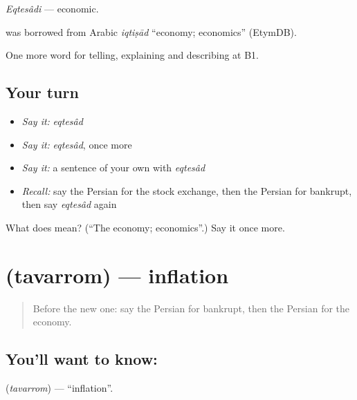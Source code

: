 \emph{Eqtesâdi} — economic.

\begin{cousinweb}
\textbf{} was borrowed from Arabic \emph{iqtiṣād} \textquotedblleft{}economy; economics\textquotedblright{} (EtymDB).
\end{cousinweb}

\begin{grammarlens}[title={What you've built}]
One more word for telling, explaining and describing at B1.
\end{grammarlens}

\subsection*{Your turn}
\begin{itemize}
\raggedright
  \item \emph{Say it:} \emph{eqtesâd}
  \item \emph{Say it:} \emph{eqtesâd}, once more
  \item \emph{Say it:} a sentence of your own with \emph{eqtesâd}
  \item \emph{Recall:} say the Persian for the stock exchange, then the Persian for bankrupt, then say \emph{eqtesâd} again
\end{itemize}

\begin{tcolorbox}[breakable,colback=teal!4,colframe=teal!35!black,title={Before you move on}]
What does  mean? (\textquotedblleft{}The economy; economics\textquotedblright{}.) Say it once more.
\end{tcolorbox}
\section[\texorpdfstring{\fa{تورم} (tavarrom)}{تورم (tavarrom)}]{ (tavarrom) — inflation}

\label{lesson:FA-C413-tavarrom}



\begin{quote}
Before the new one: say the Persian for bankrupt, then the Persian for the economy.
\end{quote}

\subsection*{You'll want to know: }
\textbf{} (\emph{tavarrom}) — \textquotedblleft{}inflation\textquotedblright{}.

